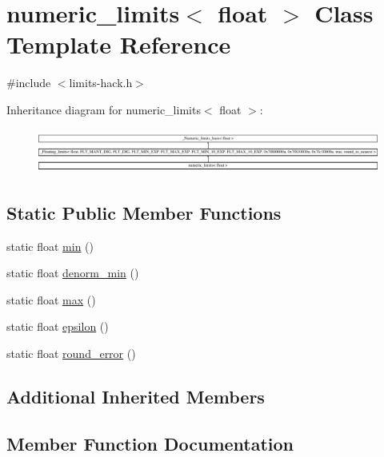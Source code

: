 \hypertarget{classnumeric__limits_3_01float_01_4}{}\section{numeric\+\_\+limits$<$ float $>$ Class Template Reference}
\label{classnumeric__limits_3_01float_01_4}


{\ttfamily \#include $<$limits-\/hack.\+h$>$}

Inheritance diagram for numeric\+\_\+limits$<$ float $>$\+:\begin{figure}[H]
\begin{center}
\leavevmode
\includegraphics[height=1.492007cm]{classnumeric__limits_3_01float_01_4}
\end{center}
\end{figure}
\subsection*{Static Public Member Functions}
\begin{DoxyCompactItemize}
\item 
static float \hyperlink{classnumeric__limits_3_01float_01_4_a270067ab9f21d9863f544443f10d070c}{min} ()
\item 
static float \hyperlink{classnumeric__limits_3_01float_01_4_a04eef3a8d582a9aadb254cc7b781e0a1}{denorm\+\_\+min} ()
\item 
static float \hyperlink{classnumeric__limits_3_01float_01_4_ab76312a20f735fd6f261c3d625bf088d}{max} ()
\item 
static float \hyperlink{classnumeric__limits_3_01float_01_4_a57b9aa59d9d3b34cf5224324f37a40a8}{epsilon} ()
\item 
static float \hyperlink{classnumeric__limits_3_01float_01_4_ab0276aa10b0a24e2548183163dce966d}{round\+\_\+error} ()
\end{DoxyCompactItemize}
\subsection*{Additional Inherited Members}


\subsection{Member Function Documentation}
\hypertarget{classnumeric__limits_3_01float_01_4_a04eef3a8d582a9aadb254cc7b781e0a1}{}
